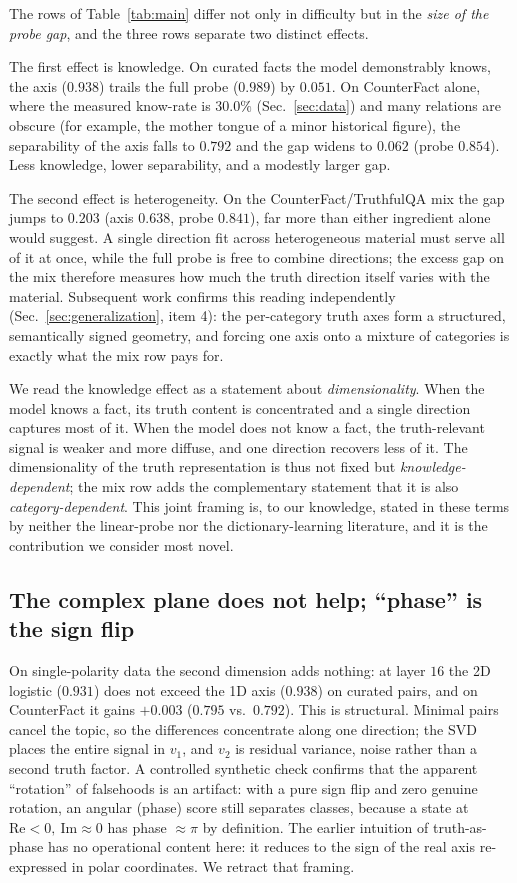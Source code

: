 \documentclass[11pt]{article}
\begin{document}
The rows of Table~\ref{tab:main} differ not only in difficulty but in the
\emph{size of the probe gap}, and the three rows separate two distinct
effects.

The first effect is knowledge. On curated facts the model demonstrably knows,
the axis ($0.938$) trails the full probe ($0.989$) by $0.051$. On CounterFact
alone, where the measured know-rate is $30.0\%$ (Sec.~\ref{sec:data}) and
many relations are obscure (for example, the mother tongue of a minor
historical figure), the separability of the axis falls to $0.792$ and the gap
widens to $0.062$ (probe $0.854$). Less knowledge, lower separability, and a
modestly larger gap.

The second effect is heterogeneity. On the CounterFact/TruthfulQA mix the gap
jumps to $0.203$ (axis $0.638$, probe $0.841$), far more than either
ingredient alone would suggest. A single direction fit across heterogeneous
material must serve all of it at once, while the full probe is free to
combine directions; the excess gap on the mix therefore measures how much the
truth direction itself varies with the material. Subsequent work confirms
this reading independently (Sec.~\ref{sec:generalization}, item 4): the
per-category truth axes form a structured, semantically signed geometry, and
forcing one axis onto a mixture of categories is exactly what the mix row
pays for.

We read the knowledge effect as a statement about \emph{dimensionality}. When
the model knows a fact, its truth content is concentrated and a single
direction captures most of it. When the model does not know a fact, the
truth-relevant signal is weaker and more diffuse, and one direction recovers
less of it. The dimensionality of the truth representation is thus not fixed
but \emph{knowledge-dependent}; the mix row adds the complementary statement
that it is also \emph{category-dependent}. This joint framing is, to our
knowledge, stated in these terms by neither the linear-probe nor the
dictionary-learning literature, and it is the contribution we consider most
novel.

\subsection{The complex plane does not help; ``phase'' is the sign flip}
\label{sec:phase}

On single-polarity data the second dimension adds nothing: at layer $16$ the
2D logistic ($0.931$) does not exceed the 1D axis ($0.938$) on curated pairs,
and on CounterFact it gains $+0.003$ ($0.795$ vs.\ $0.792$). This is
structural. Minimal pairs cancel the topic, so the differences concentrate
along one direction; the SVD places the entire signal in $v_1$, and $v_2$ is
residual variance, noise rather than a second truth factor. A controlled
synthetic check confirms that the apparent ``rotation'' of falsehoods is an
artifact: with a pure sign flip and zero genuine rotation, an angular (phase)
score still separates classes, because a state at $\mathrm{Re} < 0,\
\mathrm{Im} \approx 0$ has phase $\approx \pi$ by definition. The earlier
intuition of truth-as-phase has no operational content here: it reduces to
the sign of the real axis re-expressed in polar coordinates. We retract that
framing.
\end{document}
